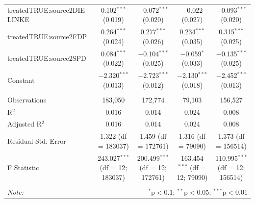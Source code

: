 \documentclass[
]{article}
\begin{document}
\begin{table}[!htbp]
\begin{tabular}{@{\extracolsep{5pt}}lcccc}
  treatedTRUE:source2DIE LINKE & 0.102$^{***}$ (0.019) & $-$0.072$^{***}$ (0.020) & $-$0.022 (0.027) & $-$0.093$^{***}$ (0.020) \\ 
  treatedTRUE:source2FDP & 0.264$^{***}$ (0.024) & 0.277$^{***}$ (0.026) & 0.234$^{***}$ (0.035) & 0.315$^{***}$ (0.025) \\ 
  treatedTRUE:source2SPD & 0.084$^{***}$ (0.022) & $-$0.104$^{***}$ (0.025) & $-$0.059$^{*}$ (0.033) & $-$0.135$^{***}$ (0.025) \\ 
  Constant & $-$2.320$^{***}$ (0.013) & $-$2.723$^{***}$ (0.012) & $-$2.130$^{***}$ (0.018) & $-$2.452$^{***}$ (0.013) \\ 
 \hline \\[-1.8ex] 
Observations & 183,050 & 172,774 & 79,103 & 156,527 \\ 
R$^{2}$ & 0.016 & 0.014 & 0.024 & 0.008 \\ 
Adjusted R$^{2}$ & 0.016 & 0.014 & 0.024 & 0.008 \\ 
Residual Std. Error & 1.322 (df = 183037) & 1.459 (df = 172761) & 1.316 (df = 79090) & 1.373 (df = 156514) \\ 
F Statistic & 243.027$^{***}$ (df = 12; 183037) & 200.499$^{***}$ (df = 12; 172761) & 163.454$^{***}$ (df = 12; 79090) & 110.995$^{***}$ (df = 12; 156514) \\ 
\hline 
\hline \\[-1.8ex] 
\textit{Note:}  & \multicolumn{4}{r}{$^{*}$p$<$0.1; $^{**}$p$<$0.05; $^{***}$p$<$0.01} \\ 
\end{tabular} 
\end{table}
\end{document}
